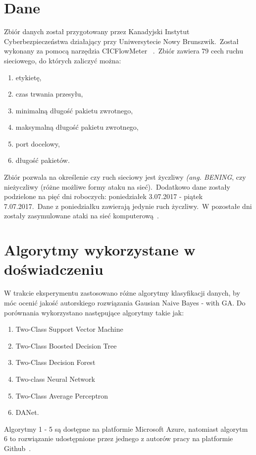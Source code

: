 \section{Dane}
\label{sec:data}
Zbiór danych został przygotowany przez Kanadyjski Instytut Cyberbezpieczeństwa działający przy Uniwersytecie Nowy Brunszwik.\ Został wykonany za pomocą narzędzia CICFlowMeter
~\cite{Ahlashkari2022}.\ Zbiór zawiera 79 cech ruchu sieciowego, do których zaliczyć można:
\begin{enumerate}
    \item etykietę,
    \item czas trwania przesyłu,
    \item minimalną długość pakietu zwrotnego,
    \item maksymalną długość pakietu zwrotnego,
    \item port docelowy,
    \item długość pakietów.
\end{enumerate}
Zbiór pozwala na określenie czy ruch sieciowy jest życzliwy \textit{(ang. BENING}, czy nieżyczliwy (różne możliwe formy ataku na sieć).\ Dodatkowo dane zostały podzielone na pięć dni roboczych: poniedziałek 3.07.2017 - piątek 7.07.2017.\ Dane z poniedziałku zawierają jedynie ruch życzliwy.\ W pozostałe dni zostały zasymulowane ataki na sieć komputerową~\cite{Blyszcz2022, unbkaggle}.


\section{Algorytmy wykorzystane w doświadczeniu}
\label{sec:alg}
W trakcie eksperymentu zastosowano różne algorytmy klasyfikacji danych, by móc ocenić jakość autorskiego rozwiązania Gausian Naive Bayes - with GA. Do porównania wykorzystano następujące algorytmy takie jak:
\begin{enumerate}
    \item Two-Class Support Vector Machine
    \item Two-Class Boosted Decision Tree
    \item Two-Class Decision Forest
    \item Two-class Neural Network
    \item Two-Class Average Perceptron
    \item DANet.
\end{enumerate}
Algorytmy 1 - 5 są dostępne na platformie Microsoft Azure, natomiast algorytm 6 to rozwiązanie udostępnione przez jednego z autorów pracy na platformie Github~\cite{Danet}.

